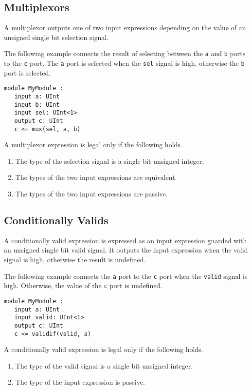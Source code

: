 \documentclass[12pt]{article}
\begin{document}
\subsection{Multiplexors}

A multiplexor outputs one of two input expressions depending on the value of an unsigned single bit selection signal. 

The following example connects the result of selecting between the \verb|a| and \verb|b| ports to the \verb|c| port. The \verb|a| port is selected when the \verb|sel| signal is high, otherwise the \verb|b| port is selected.
\begin{verbatim}
module MyModule :
   input a: UInt
   input b: UInt
   input sel: UInt<1>   
   output c: UInt
   c <= mux(sel, a, b)
\end{verbatim}

A multiplexor expression is legal only if the following holds.
\begin{enumerate}
\item The type of the selection signal is a single bit unsigned integer.
\item The types of the two input expressions are equivalent.
\item The types of the two input expressions are passive.
\end{enumerate}

\subsection{Conditionally Valids}

A conditionally valid expression is expressed as an input expression guarded with an unsigned single bit valid signal. It outputs the input expression when the valid signal is high, otherwise the result is undefined.

The following example connects the \verb|a| port to the \verb|c| port when the \verb|valid| signal is high. Otherwise, the value of the \verb|c| port is undefined.
\begin{verbatim}
module MyModule :
   input a: UInt
   input valid: UInt<1>   
   output c: UInt
   c <= validif(valid, a)
\end{verbatim}

A conditionally valid expression is legal only if the following holds.
\begin{enumerate}
\item The type of the valid signal is a single bit unsigned integer.
\item The type of the input expression is passive.
\end{enumerate}
\end{document}
